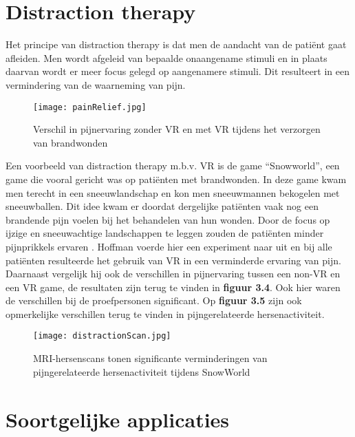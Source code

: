 \section{Distraction therapy}
Het principe van distraction therapy is dat men de aandacht van de patiënt gaat afleiden. Men wordt afgeleid van bepaalde onaangename stimuli en in plaats daarvan wordt er meer focus gelegd op aangenamere stimuli. Dit resulteert in een vermindering van de waarneming van pijn. 

\begin{figure}[h]
    \centering
    \texttt{[image: painRelief.jpg]}
    \caption{ Verschil in pijnervaring zonder VR en met VR tijdens het verzorgen van brandwonden \autocite{Panjwani2017}}
\end{figure}

\newpage

Een voorbeeld van distraction therapy m.b.v. VR is de game “Snowworld”, een game die vooral gericht was op patiënten met brandwonden. In deze game kwam men terecht in een sneeuwlandschap en kon men sneeuwmannen bekogelen met sneeuwballen. Dit idee kwam er doordat dergelijke patiënten vaak nog een brandende pijn voelen bij het behandelen van hun wonden. Door de focus op ijzige en sneeuwachtige landschappen te leggen zouden de patiënten minder pijnprikkels ervaren \autocite{Panjwani2017} .
Hoffman voerde hier een experiment naar uit en bij alle patiënten resulteerde het gebruik van VR in een verminderde ervaring van pijn. Daarnaast vergelijk hij ook de verschillen in pijnervaring tussen een non-VR en een VR game, de resultaten zijn terug te vinden in \textbf{figuur 3.4}. Ook hier waren de verschillen bij de proefpersonen significant. Op \textbf{figuur 3.5} zijn ook opmerkelijke verschillen terug te vinden in pijngerelateerde hersenactiviteit.

\begin{figure}[h]
    \centering
    \texttt{[image: distractionScan.jpg]}
    \caption{MRI-hersenscans tonen significante verminderingen van pijngerelateerde hersenactiviteit tijdens SnowWorld \autocite{Washington2017}}
\end{figure}

\section{Soortgelijke applicaties}
